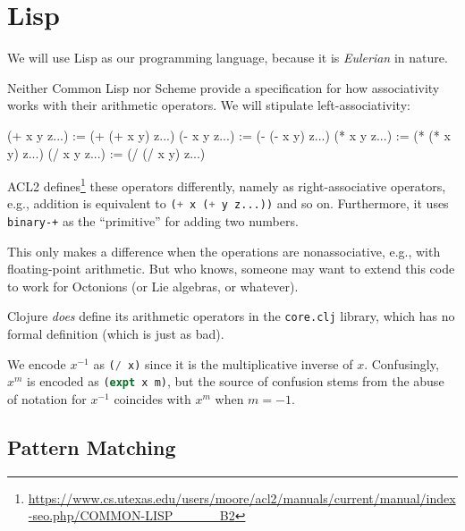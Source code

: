 \chapter{Lisp}

\M
We will use Lisp as our programming language, because it is
\emph{Eulerian} in nature.

Neither Common Lisp nor Scheme provide a specification for how
associativity works with their arithmetic operators. We will stipulate
left-associativity:

\begin{lisp-example}
(+ x y z...) := (+ (+ x y) z...)
(- x y z...) := (- (- x y) z...)
(* x y z...) := (* (* x y) z...)
(/ x y z...) := (/ (/ x y) z...)
\end{lisp-example}

\begin{remark}
ACL2 defines\footnote{\url{https://www.cs.utexas.edu/users/moore/acl2/manuals/current/manual/index-seo.php/COMMON-LISP_____B2}}
these operators differently, namely as right-associative operators,
e.g., addition is equivalent to \lstinline[language=lisp]{(+ x (+ y z...))}
and so on. Furthermore, it uses \lstinline[language=lisp]{binary-+} as the
``primitive'' for adding two numbers.
\end{remark}

\begin{remark}
This only makes a difference when the operations are nonassociative,
e.g., with floating-point arithmetic. But who knows, someone may want to
extend this code to work for Octonions (or Lie algebras, or whatever).
\end{remark}

\begin{remark}
Clojure \emph{does} define its arithmetic operators in the
\verb#core.clj# library, which has no formal definition (which is just
as bad).
\end{remark}

We encode $x^{-1}$ as \lstinline[language=lisp]{(/ x)} since it is the
multiplicative inverse of $x$. Confusingly, $x^{m}$ is encoded as
\lstinline[language=lisp]{(expt x m)}, but the source of confusion stems
from the abuse of notation for $x^{-1}$ coincides with $x^{m}$ when $m=-1$.

\section{Pattern Matching}


